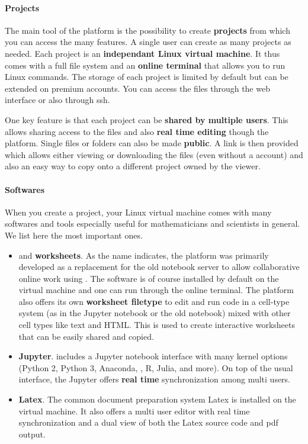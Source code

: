 \documentclass{deliverablereport}
\begin{document}
\paragraph{Projects}

The main tool of the \SMC platform is the possibility to create
\textbf{projects} from which you can access the many features. A
single user can create as many projects as needed. Each project is an
\textbf{independant Linux virtual machine}. It thus comes with a full
file system and an \textbf{online terminal} that allows you to run
Linux commands. The storage of each project is limited by default but
can be extended on premium accounts. You can access the files through
the \SMC web interface or also through ssh.

One key feature is that each project can be \textbf{shared by multiple
  users}. This allows sharing access to the files and also
\textbf{real time editing} though the platform. Single files or
folders can also be made \textbf{public}. A link is then provided
which allows either viewing or downloading the files (even without a
\SMC account) and also an easy way to copy onto a different \SMC
project owned by the viewer.

\paragraph{Softwares}

When you create a \SMC project, your Linux virtual machine comes with
many softwares and tools especially useful for mathematicians and
scientists in general.  We list here the most important ones.

\begin{itemize}
\item \Sage and \Sage \textbf{worksheets}. As the name indicates, the
  platform was primarily developed as a replacement for the old \Sage
  notebook server to allow collaborative online work using \Sage. The
  \Sage software is of course installed by default on the virtual
  machine and one can run \Sage through the online terminal. The
  platform also offers its own \Sage \textbf{worksheet filetype} to
  edit and run \Sage code in a cell-type system (as in the Jupyter
  notebook or the old \Sage notebook) mixed with other cell types like
  text and HTML. This is used to create interactive worksheets that
  can be easily shared and copied.
\item \textbf{Jupyter}. \SMC includes a Jupyter notebook interface
  with many kernel options (Python 2, Python 3, Anaconda, \Sage, R,
  Julia, and more). On top of the usual interface, the \SMC Jupyter
  offers \textbf{real time} synchronization among multi users.
\item \textbf{Latex}. The common document preparation system Latex is
  installed on the virtual machine. It also offers a multi user editor
  with real time synchronization and a dual view of both the Latex
  source code and pdf output.
\end{itemize}
\end{document}
